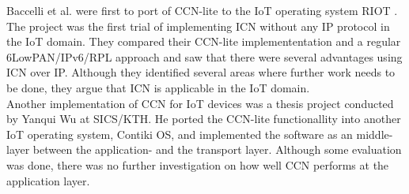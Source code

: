 Baccelli et al. were first to port of CCN-lite to the IoT operating system RIOT \cite{icniotexpinwild}\cite{RIOT}. The project was the first trial of implementing ICN without any IP protocol in the IoT domain. They compared their CCN-lite implemententation and a regular 6LowPAN/IPv6/RPL approach and saw that there were several advantages using ICN over IP. Although they identified several areas where further work needs to be done, they argue that ICN is applicable in the IoT domain.\\
Another implementation of CCN for IoT devices was a thesis project conducted by Yanqui Wu at SICS/KTH\cite{yanqui}. He ported the CCN-lite functionallity into another IoT operating system, Contiki OS, and implemented the software as an middle-layer between the application- and the transport layer. Although some evaluation was done, there was no further investigation on how well CCN performs at the application layer. \\

